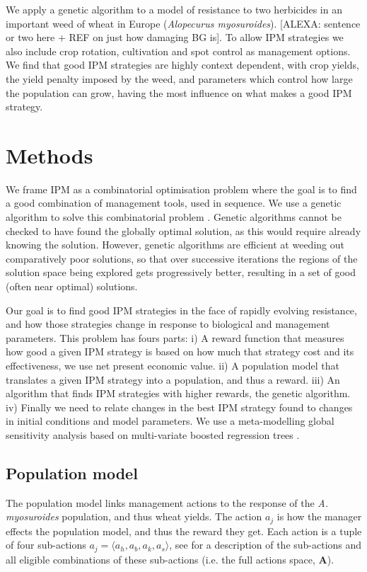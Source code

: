 \documentclass[12pt, a4paper]{article}
\begin{document}
We apply a genetic algorithm to a model of resistance to two herbicides in an important weed of wheat in Europe (\textit{Alopecurus myosuroides}). [ALEXA: sentence or two here + REF on just how damaging BG is]. To allow IPM strategies we also include crop rotation, cultivation and spot control as management options. We find that good IPM strategies are highly context dependent, with crop yields, the yield penalty imposed by the weed, and parameters which control how large the population can grow, having the most influence on what makes a good IPM strategy.   

\section*{Methods}
We frame IPM as a combinatorial optimisation problem where the goal is to find a good combination of management tools, used in sequence. We use a genetic algorithm to solve this combinatorial problem \citep{Tayl2004GA, Carr2010}. Genetic algorithms cannot be checked to have found the globally optimal solution, as this would require already knowing the solution. However, genetic algorithms are efficient at weeding out comparatively poor solutions, so that over successive iterations the regions of the solution space being explored gets progressively better, resulting in a set of good (often near optimal) solutions.

Our goal is to find good IPM strategies in the face of rapidly evolving resistance, and how those strategies change in response to biological and management parameters. This problem has fours parts: i) A reward function that measures how good a given IPM strategy is based on how much that strategy cost and its effectiveness, we use net present economic value. ii) A population model that translates a given IPM strategy into a population, and thus a reward. iii) An algorithm that finds IPM strategies with higher rewards, the genetic algorithm. iv) Finally we need to relate changes in the best IPM strategy found to changes in initial conditions and model parameters. We use a meta-modelling global sensitivity analysis \citep{Cout2014} based on multi-variate boosted regression trees \citep{Mill2016}. 

\subsection*{Population model}
The population model links management actions to the response of the \textit{A. myosuroides} population, and thus wheat yields. The action $a_j$ is how the manager effects the population model, and thus the reward they get. Each action is a tuple of four sub-actions $a_j = \langle a_h, a_b, a_k, a_s \rangle$, see  for a description of the sub-actions and all eligible combinations of these sub-actions (i.e. the full actions space, $\mathbf{A}$). 
\end{document}
